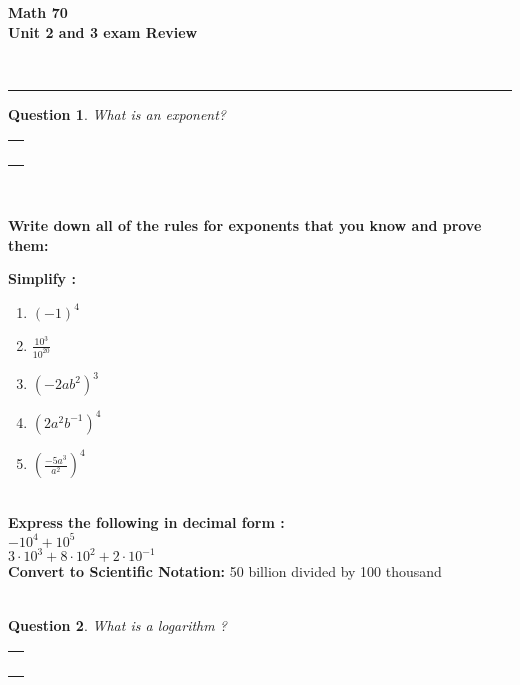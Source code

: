 \documentclass[11pt]{amsart}
\newcommand{\HRule}{\rule{\linewidth}{0.5mm}}
\newcommand{\ansbox}{
\begin{center}  
\begin{tabular}{|c|}        %
\hline
\hspace{4.5in} \\
\hspace{4.5in} \\
\hspace{4.5in} \\
\hspace{4.5in} \\
\hline
\end{tabular}\\
\end{center}}
\newtheorem*{quest}{Question}
\begin{document}
\begin{minipage}{0.4\textwidth}
\begin{flushleft} \large
 \textsc{}
\end{flushleft}
\end{minipage}
\begin{minipage}{0.6\textwidth}
\begin{flushright} \Large
{\bf Math 70   \\
Unit 2 and 3 exam Review} 
\end{flushright}
\end{minipage}\\

\HRule
\begin{quest} What is an exponent?  \end{quest}
\ansbox 

{\bf Write down all of the rules for exponents that you know and prove them: } 
\vspace{10cm}

{\bf Simplify : } 

\begin{enumerate}
\item $ (-1)^4 $ \\
\item  $\displaystyle \frac{10^3}{10^{20}} $\\
\item $ ( -2ab^2)^3 $\\
\item $(2a^2b^{-1})^4 $ \\

\item $\displaystyle\left( \frac{-5a^3}{a^2}\right)^4 $\\ \\


\end{enumerate}

{\bf Express the following in decimal form : }\\

 $-10^4 + 10^5 $\\
 
$3\cdot 10^3 + 8 \cdot 10^2 + 2\cdot 10^{-1} $ \\

{\bf Convert to Scientific Notation: } 
50 billion divided by 100 thousand \\ \\

\begin{quest} What is a logarithm ?   \end{quest} 
\ansbox
\vspace{1cm}
\end{document}
